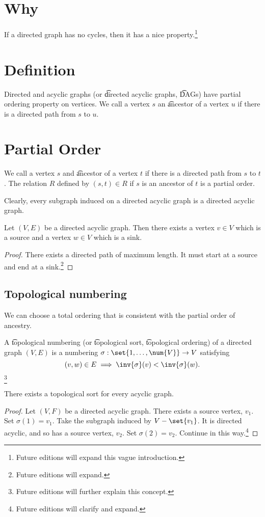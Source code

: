 
\section*{Why}

If a directed graph has no cycles, then it has a nice property.\footnote{Future editions will expand this vague introduction.}

\section*{Definition}

Directed and acyclic graphs (or \t{directed acyclic graphs}, \t{DAGs}) have partial ordering property on vertices.
We call a vertex $s$ an \t{ancestor} of a vertex $u$ if there is a directed path from $s$ to $u$.

\section*{Partial Order}

We call a vertex $s$ and \t{ancestor} of a vertex $t$ if there is a directed path from $s$ to $t$.
The relation $R$ defined by $(s, t) \in R$ if $s$ is an ancestor of $t$ is a partial order.

Clearly, every subgraph induced on a directed acyclic graph is a directed acyclic graph.

\begin{proposition}
Let $(V, E)$ be a directed acyclic graph. Then there exists a vertex $v \in V$ which is a source and a vertex $w \in V$ which is a sink.
\begin{proof}There exists a directed path of maximum length. It must start at a source and end at a sink.\footnote{Future editions will expand.}\end{proof}
\end{proposition}

\subsection*{Topological numbering}

We can choose a total ordering that is consistent with the partial order of ancestry.

A \t{topological numbering} (or \t{topological sort}, \t{topological ordering}) of a directed graph $(V, E)$ is a numbering $\sigma : \set{1, \dots , \num{V}} \to V$ satisfying
\[
(v, w) \in E \implies \inv{\sigma }(v) < \inv{\sigma }(w).
\]\footnote{Future editions will further explain this concept.}

\begin{proposition}
There exists a topological sort for every acyclic graph.
\end{proposition}

\begin{proof}Let $(V, F)$ be a directed acyclic graph.
There exists a source vertex, $v_1$.
Set $\sigma (1) = v_1$.
Take the subgraph induced by $V - \set{v_1}$.
It is directed acyclic, and so has a source vertex, $v_2$.
Set $\sigma (2) = v_2$.
Continue in this way.\footnote{Future editions will clarify and expand.}\end{proof}
\blankpage